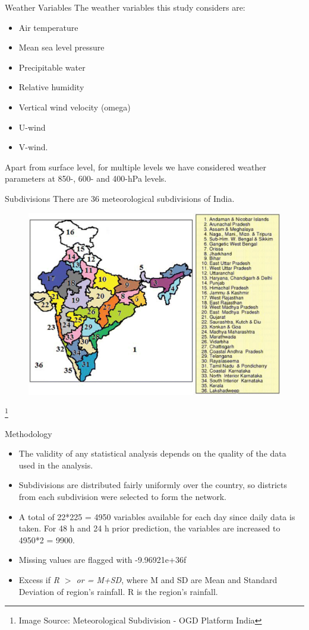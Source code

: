 \documentclass[11pt]{beamer}
\begin{document}
\begin{frame}{Weather Variables}
The weather variables this study considers are:
\begin{itemize}
\item Air temperature
\item Mean sea level pressure
\item Precipitable water
\item Relative humidity
\item Vertical wind velocity (omega)
\item U-wind
\item V-wind.
\end{itemize}
Apart from surface level, for multiple levels we have considered weather parameters at 850-, 600- and 400-hPa levels.
\end{frame}

\begin{frame}{Subdivisions}
There are 36 meteorological subdivisions of India.
\begin{figure}
\includegraphics[scale=0.13]{Fig1.png}
\end{figure}
\footnote{\small Image Source: Meteorological Subdivision - OGD Platform India}
\end{frame}

\begin{frame}{Methodology}
\begin{itemize}
\item The validity of any statistical analysis depends on the quality of the data used in the analysis.
\item  Subdivisions are distributed fairly uniformly over the country, so  districts from each subdivision were selected to form the network.
\item A total of 22*225 = 4950 variables available for each day since daily data is taken. For 48 h and 24 h prior prediction, the variables are increased to 4950*2 = 9900. 
\item Missing values are flagged with -9.96921e+36f
\item Excess if \textit{R $>$ or = M+SD}, where M and SD are Mean and Standard Deviation of region's rainfall. R is the region's rainfall.
\end{itemize}
\end{frame}
\end{document}
